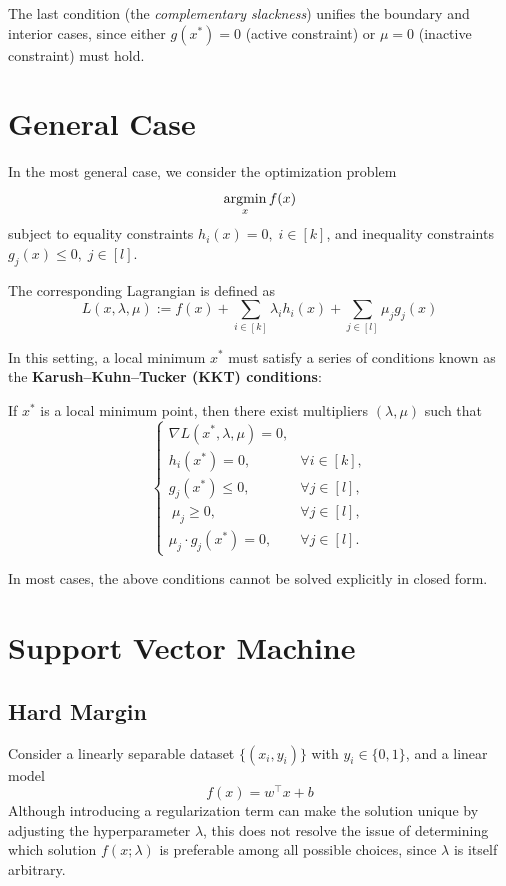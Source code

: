 \documentclass[../main]{subfiles}
\begin{document}
The last condition (the \emph{complementary slackness}) unifies the boundary and interior cases, since either $g(x^*)=0$ (active constraint) or $\mu=0$ (inactive constraint) must hold.
\section{General Case}
In the most general case, we consider the optimization problem
\begin{equation}
    \mathop{\mathrm{argmin}}_x f(x)
\end{equation}
subject to equality constraints $h_i(x) = 0, \; i \in [k]$, and inequality constraints $g_j(x) \leq 0, \; j \in [l]$.  

The corresponding Lagrangian is defined as
\begin{equation}
    L(x, \lambda, \mu) := f(x) + \sum_{i \in [k]} \lambda_i h_i(x) + \sum_{j \in [l]} \mu_j g_j(x)
\end{equation}

In this setting, a local minimum $x^*$ must satisfy a series of conditions known as the \textbf{Karush--Kuhn--Tucker (KKT) conditions}:

\begin{theorem}
    If $x^*$ is a local minimum point, then there exist multipliers $(\lambda, \mu)$ such that
    \begin{equation}
        \begin{cases}
            \nabla L(x^*, \lambda, \mu) = 0, & \\
            h_i(x^*) = 0, & \forall i \in [k],  \\
            g_j(x^*) \leq 0, & \forall j \in [l], \\\
            \mu_j \geq 0, & \forall j \in [l], \\
            \mu_j \cdot g_j(x^*) = 0, & \forall j \in [l]. 
        \end{cases}
    \end{equation}
\end{theorem}

In most cases, the above conditions cannot be solved explicitly in closed form.  

\section{Support Vector Machine}
\subsection{Hard Margin}
Consider a linearly separable dataset $\{(x_i, y_i)\}$ with $y_i \in \{0,1\}$, and a linear model
\begin{equation}
    f(x) = w^\top x + b
\end{equation}
Although introducing a regularization term can make the solution unique by adjusting the hyperparameter $\lambda$, this does not resolve the issue of determining which solution $f(x;\lambda)$ is preferable among all possible choices, since $\lambda$ is itself arbitrary.
\end{document}
